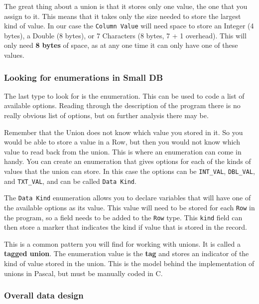 The great thing about a union is that it stores only one value, the one that you assign to it. This means that it takes only the size needed to store the largest kind of value. In our case the \texttt{Column Value} will need space to store an Integer (4 bytes), a Double (8 bytes), or 7 Characters (8 bytes, 7 + 1 overhead). This will only need \textbf{8 bytes} of space, as at any one time it can only have one of these values. 


\subsubsection{Looking for enumerations in Small DB} %
\label{ssub:looking_for_enumerations_in_small_db}

The last type to look for is the enumeration. This can be used to code a list of available options. Reading through the description of the program there is no really obvious list of options, but on further analysis there may be.

Remember that the Union does not know which value you stored in it. So you would be able to store a value in a Row, but then you would not know which value to read back from the union. This is where an enumeration can come in handy. You can create an enumeration that gives options for each of the kinds of values that the union can store. In this case the options can be \texttt{INT\_VAL}, \texttt{DBL\_VAL}, and \texttt{TXT\_VAL}, and can be called \texttt{Data Kind}.

The \texttt{Data Kind} enumeration allows you to declare variables that will have one of the available options as its value. This value will need to be stored for each \texttt{Row} in the program, so a field needs to be added to the \texttt{Row} type. This \texttt{kind} field can then store a marker that indicates the kind if value that is stored in the record.

This is a common pattern you will find for working with unions. It is called a \textbf{tagged union}. The enumeration value is the \textbf{tag} and stores an indicator of the kind of value stored in the union. This is the model behind the implementation of unions in Pascal, but must be manually coded in C.


\subsubsection{Overall data design} %
\label{ssub:overall_data_design}


